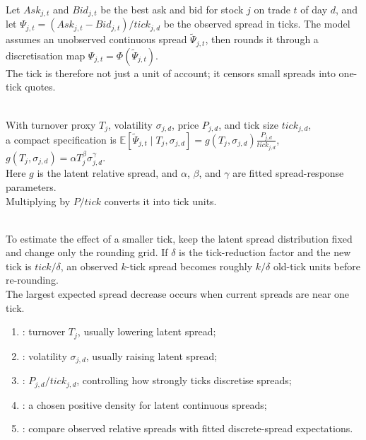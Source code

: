 \begin{model} \\
Let $Ask_{j,t}$ and $Bid_{j,t}$ be the best ask and bid for stock $j$ on trade $t$ of day $d$, and let $\Psi_{j,t}=(Ask_{j,t}-Bid_{j,t})/tick_{j,d}$ be the observed spread in ticks. The model assumes an unobserved continuous spread $\widetilde{\Psi}_{j,t}$, then rounds it through a discretisation map $\Psi_{j,t}=\Phi(\widetilde{\Psi}_{j,t})$.\\
The tick is therefore not just a unit of account; it censors small spreads into one-tick quotes.
\end{model}

\begin{definition} \\
With turnover proxy $T_j$, volatility $\sigma_{j,d}$, price $P_{j,d}$, and tick size $tick_{j,d}$,\\
a compact specification is $\mathbb{E}[\widetilde{\Psi}_{j,t}\mid T_j,\sigma_{j,d}] =g(T_j,\sigma_{j,d})\frac{P_{j,d}}{tick_{j,d}}$, $g(T_j,\sigma_{j,d})=\alpha T_j^\beta\sigma_{j,d}^{\gamma}$.\\
Here $g$ is the latent relative spread, and $\alpha$, $\beta$, and $\gamma$ are fitted spread-response parameters.\\
Multiplying by $P/tick$ converts it into tick units.
\end{definition}

\begin{mechanism} \\
To estimate the effect of a smaller tick, keep the latent spread distribution fixed and change only the rounding grid. If $\delta$ is the tick-reduction factor and the new tick is $tick/\delta$, an observed $k$-tick spread becomes roughly $k/\delta$ old-tick units before re-rounding.\\
The largest expected spread decrease occurs when current spreads are near one tick.
\end{mechanism}

\begin{taxonomy} 
\begin{enumerate}[label=\roman*.]
\setlength{\itemsep}{0pt}
\item {}: turnover $T_j$, usually lowering latent spread;
\item {}: volatility $\sigma_{j,d}$, usually raising latent spread;
\item {}: $P_{j,d}/tick_{j,d}$, controlling how strongly ticks discretise spreads;
\item {}: a chosen positive density for latent continuous spreads;
\item {}: compare observed relative spreads with fitted discrete-spread expectations.
\end{enumerate}
\end{taxonomy}

